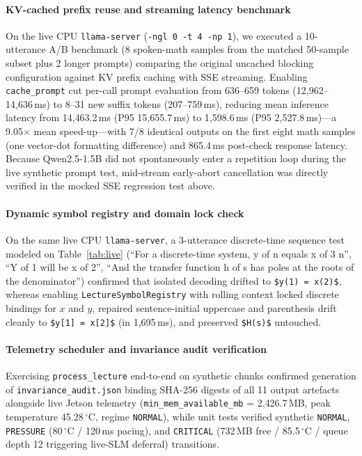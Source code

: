 \documentclass[11pt,a4paper,oneside]{report}
\theoremstyle{definition}
\newcommand{\code}[1]{\texttt{\small #1}}
\begin{document}
\paragraph{KV-cached prefix reuse and streaming latency benchmark} On the live CPU \code{llama-server} (\code{-ngl 0 -t 4 -np 1}), we executed a 10-utterance A/B benchmark (8 spoken-math samples from the matched 50-sample subset plus 2 longer prompts) comparing the original uncached blocking configuration against KV prefix caching with SSE streaming. Enabling \code{cache\_prompt} cut per-call prompt evaluation from 636--659 tokens (12{,}962--14{,}636\,ms) to 8--31 new suffix tokens (207--759\,ms), reducing mean inference latency from 14{,}463.2\,ms (P95 15{,}655.7\,ms) to 1{,}598.6\,ms (P95 2{,}527.8\,ms)---a 9.05$\times$ mean speed-up---with 7/8 identical outputs on the first eight math samples (one vector-dot formatting difference) and 865.4\,ms post-check response latency. Because Qwen2.5-1.5B did not spontaneously enter a repetition loop during the live synthetic prompt test, mid-stream early-abort cancellation was directly verified in the mocked SSE regression test above.

\paragraph{Dynamic symbol registry and domain lock check} On the same live CPU \code{llama-server}, a 3-utterance discrete-time sequence test modeled on Table~\ref{tab:live} (``For a discrete-time system, y of n equals x of 3 n'', ``Y of 1 will be x of 2'', ``And the transfer function h of s has poles at the roots of the denominator'') confirmed that isolated decoding drifted to \verb|$y(1) = x(2)$|, whereas enabling \code{LectureSymbolRegistry} with rolling context locked discrete bindings for $x$ and $y$, repaired sentence-initial uppercase and parenthesis drift cleanly to \verb|$y[1] = x[2]$| (in 1{,}695\,ms), and preserved \verb|$H(s)$| untouched.

\paragraph{Telemetry scheduler and invariance audit verification} Exercising \code{process\_lecture} end-to-end on synthetic chunks confirmed generation of \code{invariance\_audit.json} binding SHA-256 digests of all 11 output artefacts alongside live Jetson telemetry (\code{min\_mem\_available\_mb} = 2{,}426.7\,MB, peak temperature 45.28\,$^\circ$C, regime \code{NORMAL}), while unit tests verified synthetic \code{NORMAL}, \code{PRESSURE} (80\,$^\circ$C / 120\,ms pacing), and \code{CRITICAL} (732\,MB free / 85.5\,$^\circ$C / queue depth 12 triggering live-SLM deferral) transitions.
\endgroup
\end{document}
